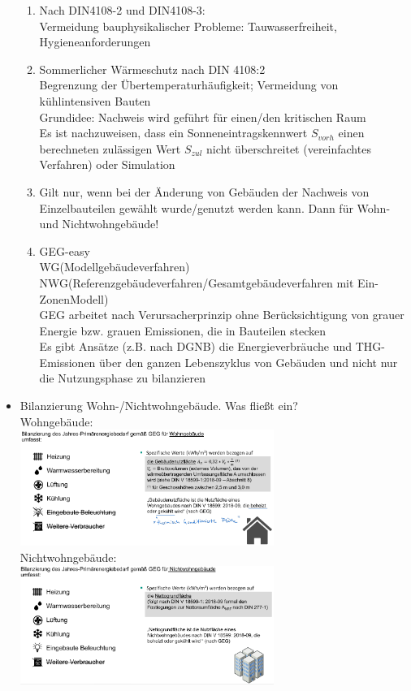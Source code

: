 \documentclass[fleqn,twoside,dvipsnames]{article}
\begin{document}
\begin{itemize}
\begin{enumerate}
                    \item Nach DIN4108-2 und DIN4108-3:\\Vermeidung bauphysikalischer Probleme: Tauwasserfreiheit, Hygieneanforderungen
                    \item Sommerlicher Wärmeschutz nach DIN 4108:2 \\Begrenzung der Übertemperaturhäufigkeit; Vermeidung von kühlintensiven Bauten\\Grundidee: Nachweis wird geführt für einen/den kritischen Raum \\ Es ist nachzuweisen, dass ein Sonneneintragskennwert $S_{vorh}$ einen berechneten zulässigen Wert $S_{zul}$ nicht überschreitet (vereinfachtes Verfahren) oder Simulation
                    \item Gilt nur, wenn bei der Änderung von Gebäuden der Nachweis von Einzelbauteilen gewählt wurde/genutzt werden kann. Dann für Wohn- und Nichtwohngebäude!
                    \item GEG-easy \\WG(Modellgebäudeverfahren) \\NWG(Referenzgebäudeverfahren/Gesamtgebäudeverfahren mit Ein-ZonenModell)\\
                    GEG arbeitet nach Verursacherprinzip ohne Berücksichtigung von grauer Energie bzw. grauen Emissionen, die in Bauteilen stecken \\
                    Es gibt Ansätze (z.B. nach DGNB) die Energieverbräuche und THG-Emissionen über den ganzen Lebenszyklus von Gebäuden und nicht nur die Nutzungsphase zu bilanzieren                
                \end{enumerate}
            \item Bilanzierung Wohn-/Nichtwohngebäude. Was fließt ein?\\
                Wohngebäude:\\
                \includegraphics[width=0.65\textwidth]{Grafiken/ES/Bilanzierung WG.png}\\
                Nichtwohngebäude:\\
                \includegraphics[width=0.65\textwidth]{Grafiken/ES/Bilanzierung NWG.png}

\end{itemize}
\end{document}

